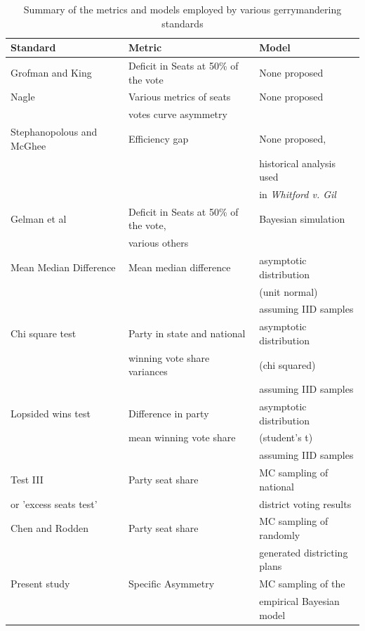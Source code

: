 \documentclass[preprint,12pt]{article}
\begin{document}
\begin{table}[htb!]
\centering
\caption{Summary of the metrics and models employed by various gerrymandering standards \label{tab:Stand}}
\begin{tabular}{|l|l|l|}
\hline
Standard & Metric & Model\\
\hline
\hline
Grofman and King & Deficit in Seats at 50\% of the vote & None proposed\\
\hline
Nagle & Various metrics of seats & None proposed\\
      & votes curve asymmetry &  \\
\hline
Stephanopolous and McGhee & Efficiency gap & None proposed,\\
                          &                & historical analysis used\\
                          &                & in \emph{Whitford v. Gil}\\
\hline
Gelman et al & Deficit in Seats at 50\% of the vote, & Bayesian simulation\\
             & various others & \\
\hline
Mean Median Difference & Mean median difference & asymptotic distribution \\
 &                                              & (unit normal) \\
 &                                              & assuming IID samples \\
\hline
Chi square test & Party in state and national  & asymptotic distribution  \\
                & winning vote share variances  & (chi squared) \\
                &   & assuming IID samples \\
\hline
Lopsided wins test & Difference in party  & asymptotic distribution  \\
                   &  mean winning vote share & (student's t) \\
                   &   & assuming IID samples \\
\hline
Test III \cite{Wang_2016_10.1089/elj.2016.0387} & Party seat share & MC sampling of national \\
or 'excess seats test'         &                  & district voting results\\
\hline
Chen and Rodden & Party seat share & MC sampling of randomly \\
         &                         & generated districting plans\\
\hline
Present study & Specific Asymmetry & MC sampling of the \\
              &                    & empirical Bayesian model\\
\hline
\end{tabular}
\end{table}
\end{document}
